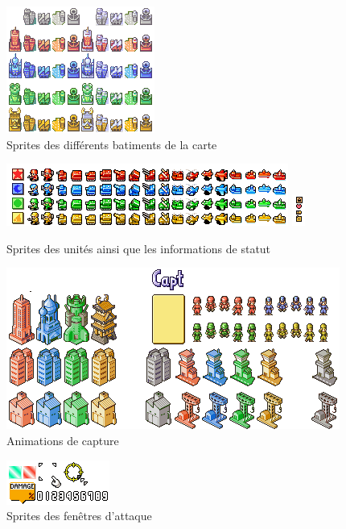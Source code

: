 \documentclass[12pt]{report}
\begin{document}
    \begin{figure}[h]
    \begin{center}
    \includegraphics{advance_wars_sprites_cities.png}
    \end{center}
    \caption{Sprites des différents batiments de la carte}
    \end{figure}
    
    \begin{figure}[h]
    \begin{center}
    \includegraphics{advance_wars_sprites_units.png}
    \includegraphics[scale=1.8]{advance_wars_sprites_units_info.png}
    \end{center}
    \caption{Sprites des unités ainsi que les informations de statut}
    \end{figure}
    
    \begin{figure}[h]
    \begin{center}
    \includegraphics{advance_wars_sprites_capture.png}
    \end{center}
    \caption{Animations de capture}
    \end{figure}
    
    \begin{figure}[h]
    \begin{center}
    \includegraphics{advance_wars_sprites_damages.png}
    \end{center}
    \caption{Sprites des fenêtres d'attaque}
    \end{figure}
\end{document}
